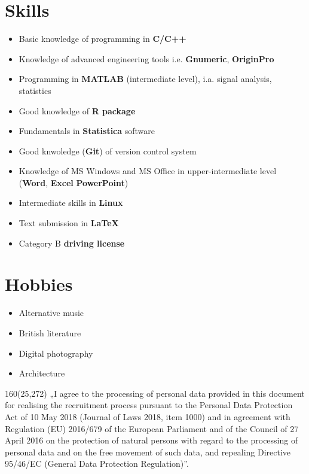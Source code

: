 \documentclass[10pt, a4paper, sans]{moderncv}   %
\begin{document}
\section{Skills}
{\begin{itemize}
	\item Basic knowledge of programming in \textbf{C/C++}
	\item Knowledge of advanced engineering tools i.e. \textbf{Gnumeric}, \textbf{OriginPro}
	\item Programming in \textbf{MATLAB} (intermediate level), i.a. signal analysis, statistics
    \item Good knowledge of \textbf{R package}
    \item Fundamentals in \textbf{Statistica} software
    \item Good knwoledge (\textbf{Git}) of version control system
	\item Knowledge of MS Windows and MS Office in upper-intermediate level (\textbf{Word}, \textbf{Excel} \textbf{PowerPoint})
	\item Intermediate skills in \textbf{Linux}
	\item Text submission in \textbf{\LaTeX}
	\item Category B \textbf{driving license}
\end{itemize}}



\section{Hobbies}
{\begin{itemize}
\item Alternative music
\item British literature
\item Digital photography
\item Architecture

\end{itemize}}

\begin{textblock}{160}(25,272)
\noindent „I agree to the processing of personal data provided in this document for realising the recruitment process pursuant to the Personal Data Protection Act of 10 May 2018 (Journal of Laws 2018, item 1000) and in agreement with Regulation (EU) 2016/679 of the European Parliament and of the Council of 27 April 2016 on the protection of natural persons with regard to the processing of personal data and on the free movement of such data, and repealing Directive 95/46/EC (General Data Protection Regulation)”.

\end{textblock}
\end{document}
